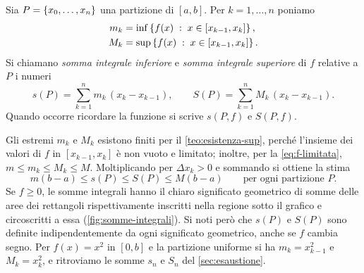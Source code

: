 \begin{definizione}\label{def:somme-integrali}
Sia $P=\left\{ x_{0},\dots,x_{n} \right\}$ una partizione di $[a,b]$. Per $k=1,\dots,n$ poniamo
\begin{equation}\label{eq:mk-Mk}
\begin{aligned}
  m_{k}&=\inf\left\{ f(x) \;:\; x\in[x_{k-1},x_{k}] \right\},\\
  M_{k}&=\sup\left\{ f(x) \;:\; x\in[x_{k-1},x_{k}] \right\} .
\end{aligned}
\end{equation}
Si chiamano \emph{somma integrale inferiore} e \emph{somma integrale superiore} di $f$
relative a $P$ i numeri
\begin{equation}\label{eq:somme-integrali}
  s(P)=\sum_{k=1}^{n}m_{k}\,(x_{k}-x_{k-1}), \qquad
  S(P)=\sum_{k=1}^{n}M_{k}\,(x_{k}-x_{k-1}) .
\end{equation}
Quando occorre ricordare la funzione si scrive $s(P,f)$ e $S(P,f)$.
\end{definizione}

Gli estremi $m_{k}$ e $M_{k}$ esistono finiti per il \cref{teo:esistenza-sup}, perché
l'insieme dei valori di $f$ in $[x_{k-1},x_{k}]$ è non vuoto e limitato; inoltre, per la
\eqref{eq:f-limitata}, $m\le m_{k}\le M_{k}\le M$. Moltiplicando per $\Delta x_{k}>0$ e
sommando si ottiene la stima
\begin{equation}\label{eq:stime-somme}
  m(b-a)\le s(P)\le S(P)\le M(b-a) \qquad\text{per ogni partizione } P .
\end{equation}
Se $f\ge0$, le somme integrali hanno il chiaro significato geometrico di somme delle
aree dei rettangoli rispettivamente inscritti nella regione sotto il grafico e
circoscritti a essa (\cref{fig:somme-integrali}). Si noti però che $s(P)$ e $S(P)$ sono
definite indipendentemente da ogni significato geometrico, anche se $f$ cambia segno.
Per $f(x)=x^{2}$ in $[0,b]$ e la partizione uniforme si ha $m_{k}=x_{k-1}^{2}$ e
$M_{k}=x_{k}^{2}$, e ritroviamo le somme $s_{n}$ e $S_{n}$ del \cref{sec:esaustione}.

